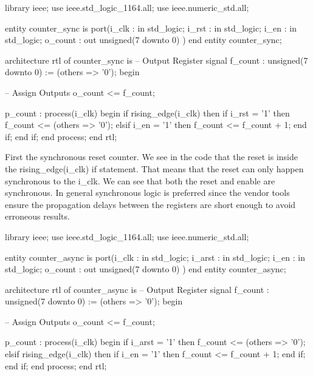 \begin{VHDLlisting}[tabsize=8]
library ieee;
  use ieee.std_logic_1164.all;
  use ieee.numeric_std.all;
  
entity counter_sync is
port(i_clk   : in    std_logic;
	 i_rst   : in    std_logic;
	 i_en    : in    std_logic;
	 o_count :   out unsigned(7 downto 0)	
)
end entity counter_sync;

architecture rtl of counter_sync is
	-- Output Register
	signal f_count : unsigned(7 downto 0) := (others => '0');
begin

	-- Assign Outputs
	o_count <= f_count;

	p_count : process(i_clk)
	begin
		if rising_edge(i_clk) then
			if i_rst = '1' then
				f_count <= (others => '0');
			elsif i_en = '1' then
				f_count <= f_count + 1;
			end if;		
		end if;
	end process;
end rtl;

\end{VHDLlisting}
	
First the synchronous reset counter. We see in the code that the reset is inside the rising\_edge(i\_clk) if statement. That means that the reset can only happen synchronous to the i\_clk. We can see that both the reset and enable are synchronous. In general synchronous logic is preferred since the vendor tools ensure the propagation delays between the registers are short enough to avoid erroneous results.


\begin{VHDLlisting}[tabsize=8]
library ieee;
  use ieee.std_logic_1164.all;
  use ieee.numeric_std.all;
  
entity counter_async is
port(i_clk   : in    std_logic;
	 i_arst  : in    std_logic;
	 i_en    : in    std_logic;
	 o_count :   out unsigned(7 downto 0)	
)
end entity counter_async;

architecture rtl of counter_async is
	-- Output Register
	signal f_count : unsigned(7 downto 0) := (others => '0');
begin

	-- Assign Outputs
	o_count <= f_count;

	p_count : process(i_clk)
	begin
		if i_arst = '1' then
			f_count <= (others => '0');
		elsif rising_edge(i_clk) then
			if i_en = '1' then
				f_count <= f_count + 1;
			end if;		
		end if;
	end process;
end rtl;

\end{VHDLlisting}
	
